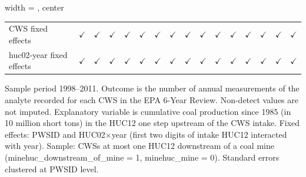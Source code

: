 \begin{table}[htbp]
\begin{adjustbox}{width = \textwidth, center}
\begin{tabular}{lccccccccccccccc}
          \\
         
         CWS fixed effects                   & $\checkmark$      & $\checkmark$       & $\checkmark$      & $\checkmark$      & $\checkmark$       & $\checkmark$      & $\checkmark$      & $\checkmark$       & $\checkmark$      & $\checkmark$      & $\checkmark$       & $\checkmark$      & $\checkmark$      & $\checkmark$       & $\checkmark$\\   
         huc02-year fixed effects            & $\checkmark$      & $\checkmark$       & $\checkmark$      & $\checkmark$      & $\checkmark$       & $\checkmark$      & $\checkmark$      & $\checkmark$       & $\checkmark$      & $\checkmark$      & $\checkmark$       & $\checkmark$      & $\checkmark$      & $\checkmark$       & $\checkmark$\\   
         
         \bottomrule
         
      \end{tabular}
      
      
      
   \end{adjustbox}
      {\tiny\linespread{1}\selectfont \par \raggedright 
   Sample period 1998--2011. Outcome is the number of annual measurements of the analyte recorded for each CWS in the EPA 6-Year Review. Non-detect values are not imputed. Explanatory variable is cumulative coal production since 1985 (in 10 million short tons) in the HUC12 one step upstream of the CWS intake. Fixed effects: PWSID and HUC02$\times$year (first two digits of intake HUC12 interacted with year). Sample: CWSs at most one HUC12 downstream of a coal mine (minehuc\_downstream\_of\_mine = 1, minehuc\_mine = 0). Standard errors clustered at PWSID level.}
   
\end{table}


